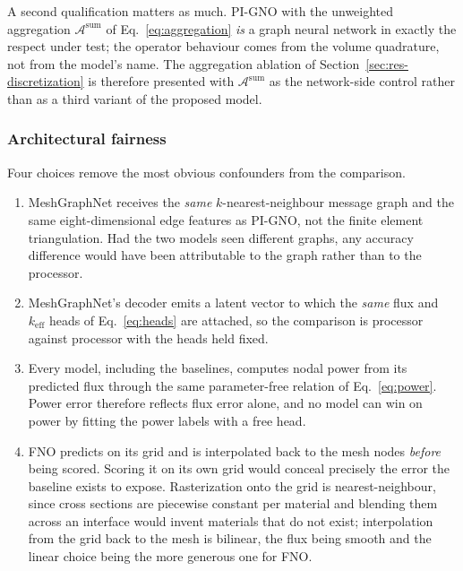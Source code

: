 \documentclass[preprint,12pt]{elsarticle}
\newcommand{\keff}{k_{\mathrm{eff}}}
\begin{document}
A second qualification matters as much. PI-GNO with the unweighted aggregation
$\mathcal{A}^{\mathrm{sum}}$ of Eq.~\eqref{eq:aggregation} \emph{is} a graph
neural network in exactly the respect under test; the operator behaviour comes
from the volume quadrature, not from the model's name. The aggregation
ablation of Section~\ref{sec:res-discretization} is therefore presented with
$\mathcal{A}^{\mathrm{sum}}$ as the network-side control rather than as a third
variant of the proposed model.

\subsubsection{Architectural fairness}
\label{sec:fairness-arch}

Four choices remove the most obvious confounders from the comparison.

\begin{enumerate}
\item MeshGraphNet receives the \emph{same} $k$-nearest-neighbour message graph
and the same eight-dimensional edge features as PI-GNO, not the finite element
triangulation. Had the two models seen different graphs, any accuracy
difference would have been attributable to the graph rather than to the
processor.
\item MeshGraphNet's decoder emits a latent vector to which the \emph{same}
flux and $\keff$ heads of Eq.~\eqref{eq:heads} are attached, so the comparison
is processor against processor with the heads held fixed.
\item Every model, including the baselines, computes nodal power from its
predicted flux through the same parameter-free relation of
Eq.~\eqref{eq:power}. Power error therefore reflects flux error alone, and no
model can win on power by fitting the power labels with a free head.
\item FNO predicts on its grid and is interpolated back to the mesh nodes
\emph{before} being scored. Scoring it on its own grid would conceal precisely
the error the baseline exists to expose. Rasterization onto the grid is
nearest-neighbour, since cross sections are piecewise constant per material and
blending them across an interface would invent materials that do not exist;
interpolation from the grid back to the mesh is bilinear, the flux being smooth
and the linear choice being the more generous one for FNO.
\end{enumerate}

\end{document}
